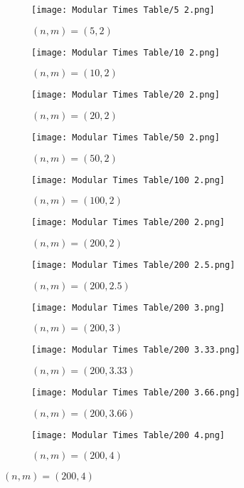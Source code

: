 \begin{figure}[H]
	\centering
	\begin{subfigure}{0.145\linewidth}
		\texttt{[image: Modular Times Table/5 2.png]}
		\caption{$(n,m) = (5,2)$}
	\end{subfigure}
	\begin{subfigure}{0.145\linewidth}
		\texttt{[image: Modular Times Table/10 2.png]}
		\caption{$(n,m) = (10,2)$}
	\end{subfigure}
	\begin{subfigure}{0.145\linewidth}
		\texttt{[image: Modular Times Table/20 2.png]}
		\caption{$(n,m) = (20,2)$}
	\end{subfigure}
	\begin{subfigure}{0.145\linewidth}
		\texttt{[image: Modular Times Table/50 2.png]}
		\caption{$(n,m) = (50,2)$}
	\end{subfigure}
	\begin{subfigure}{0.145\linewidth}
		\texttt{[image: Modular Times Table/100 2.png]}
		\caption{$(n,m) = (100,2)$}
	\end{subfigure}
	\begin{subfigure}{0.145\linewidth}
		\texttt{[image: Modular Times Table/200 2.png]}
		\caption{$(n,m) = (200,2)$}
	\end{subfigure}
		\begin{subfigure}{0.145\linewidth}
		\texttt{[image: Modular Times Table/200 2.5.png]}
		\caption{$(n,m) = (200,2.5)$}
	\end{subfigure}
	\begin{subfigure}{0.145\linewidth}
		\texttt{[image: Modular Times Table/200 3.png]}
		\caption{$(n,m) = (200,3)$}
	\end{subfigure}
	\begin{subfigure}{0.145\linewidth}
		\texttt{[image: Modular Times Table/200 3.33.png]}
		\caption{$(n,m) = (200,3.33)$}
	\end{subfigure}
	\begin{subfigure}{0.145\linewidth}
		\texttt{[image: Modular Times Table/200 3.66.png]}
		\caption{$(n,m) = (200,3.66)$}
	\end{subfigure}
	\begin{subfigure}{0.145\linewidth}
		\texttt{[image: Modular Times Table/200 4.png]}
		\caption{$(n,m) = (200,4)$}
	\end{subfigure}

\end{figure}

